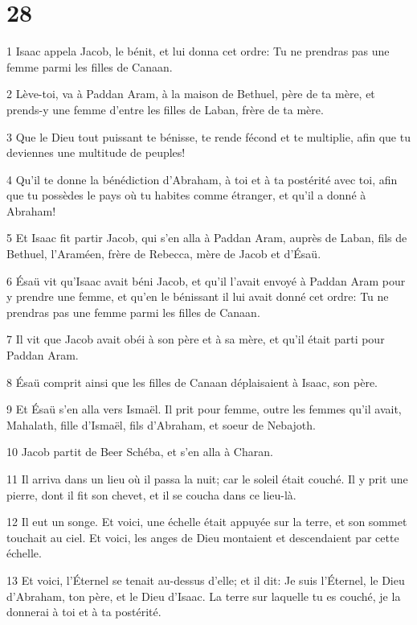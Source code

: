 \chapter{28}

\par 1 Isaac appela Jacob, le bénit, et lui donna cet ordre: Tu ne prendras pas une femme parmi les filles de Canaan.
\par 2 Lève-toi, va à Paddan Aram, à la maison de Bethuel, père de ta mère, et prends-y une femme d'entre les filles de Laban, frère de ta mère.
\par 3 Que le Dieu tout puissant te bénisse, te rende fécond et te multiplie, afin que tu deviennes une multitude de peuples!
\par 4 Qu'il te donne la bénédiction d'Abraham, à toi et à ta postérité avec toi, afin que tu possèdes le pays où tu habites comme étranger, et qu'il a donné à Abraham!
\par 5 Et Isaac fit partir Jacob, qui s'en alla à Paddan Aram, auprès de Laban, fils de Bethuel, l'Araméen, frère de Rebecca, mère de Jacob et d'Ésaü.
\par 6 Ésaü vit qu'Isaac avait béni Jacob, et qu'il l'avait envoyé à Paddan Aram pour y prendre une femme, et qu'en le bénissant il lui avait donné cet ordre: Tu ne prendras pas une femme parmi les filles de Canaan.
\par 7 Il vit que Jacob avait obéi à son père et à sa mère, et qu'il était parti pour Paddan Aram.
\par 8 Ésaü comprit ainsi que les filles de Canaan déplaisaient à Isaac, son père.
\par 9 Et Ésaü s'en alla vers Ismaël. Il prit pour femme, outre les femmes qu'il avait, Mahalath, fille d'Ismaël, fils d'Abraham, et soeur de Nebajoth.
\par 10 Jacob partit de Beer Schéba, et s'en alla à Charan.
\par 11 Il arriva dans un lieu où il passa la nuit; car le soleil était couché. Il y prit une pierre, dont il fit son chevet, et il se coucha dans ce lieu-là.
\par 12 Il eut un songe. Et voici, une échelle était appuyée sur la terre, et son sommet touchait au ciel. Et voici, les anges de Dieu montaient et descendaient par cette échelle.
\par 13 Et voici, l'Éternel se tenait au-dessus d'elle; et il dit: Je suis l'Éternel, le Dieu d'Abraham, ton père, et le Dieu d'Isaac. La terre sur laquelle tu es couché, je la donnerai à toi et à ta postérité.
